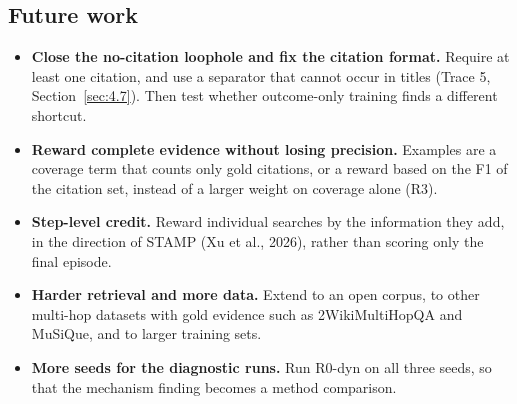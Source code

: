 \subsection{Future work}\label{sec:5.4}

\begin{itemize}
\tightlist
\item
  \textbf{Close the no-citation loophole and fix the citation format.}
  Require at least one citation, and use a separator that cannot occur
  in titles (Trace 5, Section~\ref{sec:4.7}). Then test whether
  outcome-only training finds a different shortcut.
\item
  \textbf{Reward complete evidence without losing precision.} Examples
  are a coverage term that counts only gold citations, or a reward based
  on the F1 of the citation set, instead of a larger weight on coverage
  alone (R3).
\item
  \textbf{Step-level credit.} Reward individual searches by the
  information they add, in the direction of STAMP (Xu et al., 2026),
  rather than scoring only the final episode.
\item
  \textbf{Harder retrieval and more data.} Extend to an open corpus, to
  other multi-hop datasets with gold evidence such as 2WikiMultiHopQA
  and MuSiQue, and to larger training sets.
\item
  \textbf{More seeds for the diagnostic runs.} Run R0-dyn on all three
  seeds, so that the mechanism finding becomes a method comparison.
\end{itemize}
